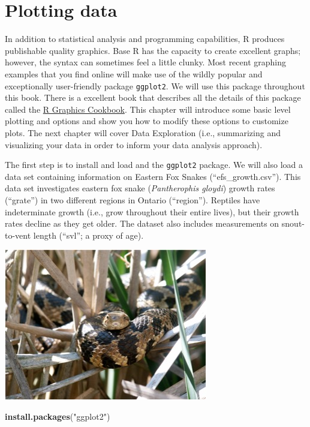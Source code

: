 \documentclass[
]{book}
\newenvironment{Shaded}{\begin{snugshade}}{\end{snugshade}}
\newcommand{\FunctionTok}[1]{\textcolor[rgb]{0.13,0.29,0.53}{\textbf{#1}}}
\newcommand{\NormalTok}[1]{#1}
\newcommand{\StringTok}[1]{\textcolor[rgb]{0.31,0.60,0.02}{#1}}
\begin{document}
\hypertarget{plotting-data}{%
\section{Plotting data}\label{plotting-data}}

In addition to statistical analysis and programming capabilities, R produces publishable quality graphics. Base R has the capacity to create excellent graphs; however, the syntax can sometimes feel a little clunky. Most recent graphing examples that you find online will make use of the wildly popular and exceptionally user-friendly package \texttt{ggplot2}. We will use this package throughout this book. There is a excellent book that describes all the details of this package called the \href{https://r-graphics.org/}{R Graphics Cookbook}. This chapter will introduce some basic level plotting and options and show you how to modify these options to customize plots. The next chapter will cover Data Exploration (i.e., summarizing and visualizing your data in order to inform your data analysis approach).

The first step is to install and load and the \texttt{ggplot2} package. We will also load a data set containing information on Eastern Fox Snakes (``efs\_growth.csv''). This data set investigates eastern fox snake (\emph{Pantherophis gloydi}) growth rates (``grate'') in two different regions in Ontario (``region''). Reptiles have indeterminate growth (i.e., grow throughout their entire lives), but their growth rates decline as they get older. The dataset also includes measurements on snout-to-vent length (``svl''; a proxy of age).

\begin{center}\includegraphics[width=0.7\linewidth]{images/EFS} \end{center}

\begin{Shaded}
\begin{Highlighting}[]
\FunctionTok{install.packages}\NormalTok{(}\StringTok{"ggplot2"}\NormalTok{)}
\end{Highlighting}
\end{Shaded}
\end{document}
